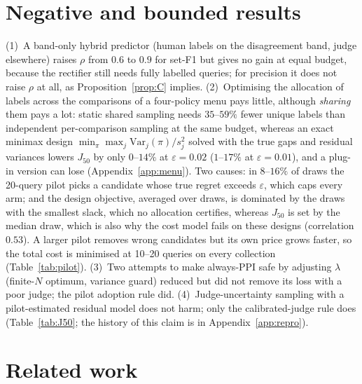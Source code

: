 \documentclass{article}
\newcommand{\eps}{\varepsilon}
\newcommand{\Jfifty}{J_{50}}
\begin{document}
\section{Negative and bounded results}\label{sec:negative}
(1)~A band-only hybrid predictor (human labels on the disagreement band, judge elsewhere) raises $\rho$ from $0.6$ to $0.9$ for set-F1 but gives no gain at equal budget, because the rectifier still needs fully labelled queries; for precision it does not raise $\rho$ at all, as Proposition~\ref{prop:C} implies. (2)~Optimising the allocation of labels across the comparisons of a four-policy menu pays little, although \emph{sharing} them pays a lot: static shared sampling needs $35$--$59\%$ fewer unique labels than independent per-comparison sampling at the same budget, whereas an exact minimax design $\min_\pi\max_j \mathrm{Var}_j(\pi)/s_j^2$ solved with the true gaps and residual variances lowers $\Jfifty$ by only $0$--$14\%$ at $\eps=0.02$ ($1$--$17\%$ at $\eps=0.01$), and a plug-in version can lose (Appendix~\ref{app:menu}). Two causes: in $8$--$16\%$ of draws the 20-query pilot picks a candidate whose true regret exceeds $\eps$, which caps every arm; and the design objective, averaged over draws, is dominated by the draws with the smallest slack, which no allocation certifies, whereas $\Jfifty$ is set by the median draw, which is also why the cost model fails on these designs (correlation $0.53$). A larger pilot removes wrong candidates but its own price grows faster, so the total cost is minimised at 10--20 queries on every collection (Table~\ref{tab:pilot}). (3)~Two attempts to make always-PPI safe by adjusting $\lambda$ (finite-$N$ optimum, variance guard) reduced but did not remove its loss with a poor judge; the pilot adoption rule did. (4)~Judge-uncertainty sampling with a pilot-estimated residual model does not harm; only the calibrated-judge rule does (Table~\ref{tab:J50}; the history of this claim is in Appendix~\ref{app:repro}).

\section{Related work}\label{sec:related}
\end{document}
